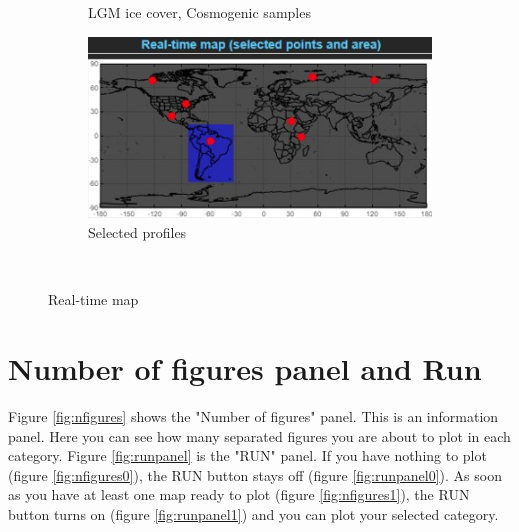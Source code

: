 \documentclass[11pt,a4paper,titlepage]{report}
\begin{document}
\begin{figure}[H]
\begin{subfigure}[H]{0.45\textwidth}
        \caption{LGM ice cover, Cosmogenic samples}
    \end{subfigure}
    \quad
    \begin{subfigure}[H]{0.45\textwidth}
        \includegraphics[width=\textwidth]{RM4.jpg}
        \caption{Selected profiles}
    \end{subfigure}\\
    \caption[Real-time map]{Real-time map}
    \label{fig:realmap}    
\end{figure}

\section{Number of figures panel and Run}
Figure \ref{fig:nfigures} shows the "Number of figures" panel. This is an information panel. Here you can see how many separated figures you are about to plot in each category. Figure \ref{fig:runpanel} is the "RUN" panel. If you have nothing to plot (figure \ref{fig:nfigures0}), the RUN button stays off (figure \ref{fig:runpanel0}). As soon as you have at least one map ready to plot (figure \ref{fig:nfigures1}), the RUN button turns on (figure \ref{fig:runpanel1}) and you can plot your selected category. 
\end{document}
